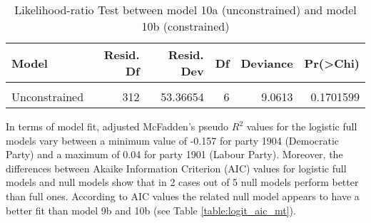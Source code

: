 \documentclass[
]{article}
\begin{document}
\begin{table}[!h]

\caption{\label{tab:unnamed-chunk-124}Likelihood-ratio Test between model 10a (unconstrained) and model 10b                               (constrained)
                  \label{table:lrtest_3_mt}}
\centering
\begin{tabular}[t]{l|r|r|r|r|r}
\hline
Model & Resid. Df & Resid. Dev & Df & Deviance & Pr(>Chi)\\
\hline
\cellcolor{gray!6}{Constrained} & \cellcolor{gray!6}{318} & \cellcolor{gray!6}{62.42784} & \cellcolor{gray!6}{} & \cellcolor{gray!6}{} & \cellcolor{gray!6}{}\\
\hline
Unconstrained & 312 & 53.36654 & 6 & 9.0613 & 0.1701599\\
\hline
\end{tabular}
\end{table}

In terms of model fit, adjusted McFadden's pseudo \(R^2\) values for the logistic full models vary between
a minimum value of
-0.157
for party 1904
(Democratic Party)
and a maximum of
0.04
for party 1901
(Labour Party).
Moreover, the differences between Akaike Information Criterion (AIC) values for logistic full models and
null models show that in 2 cases out of 5 null models perform better than full ones. According to AIC values the related null model appears to have a better fit than model 9b and 10b (see Table \ref{table:logit_aic_mt}).
\end{document}

